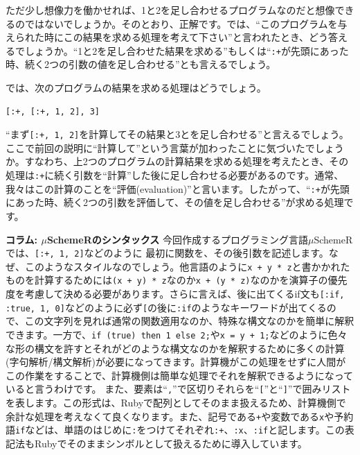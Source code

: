 ただ少し想像力を働かせれば、1と2を足し合わせるプログラムなのだと想像できるのではないでしょうか。そのとおり、正解です。では、“このプログラムを与えられた時にこの結果を求める処理を考えて下さい”と言われたとき、どう答えるでしょうか。“1と2を足し合わせた結果を求める”もしくは“{\tt :+}が先頭にあった時、続く2つの引数の値を足し合わせる”とも言えるでしょう。

では、次のプログラムの結果を求める処理はどうでしょう。

\begin{lstlisting}
[:+, [:+, 1, 2], 3]
\end{lstlisting}

“まず{\tt [:+, 1, 2]}を計算してその結果と3とを足し合わせる”と言えるでしょう。ここで前回の説明に“計算して”という言葉が加わったことに気づいたでしょうか。すなわち、上2つのプログラムの計算結果を求める処理を考えたとき、その処理は{\tt :+}に続く引数を“計算”した後に足し合わせる必要があるのです。通常、我々はこの計算のことを“評価(evaluation)”と言います。したがって、“{\tt :+}が先頭にあった時、続く2つの引数を評価して、その値を足し合わせる”が求める処理です。


\begin{breakitembox}[l]{\bf コラム: $\mu$SchemeRのシンタックス} 
今回作成するプログラミング言語$\mu$SchemeRでは、{\tt [:+, 1, 2]}などのように
最初に関数を、その後引数を記述します。なぜ、このようなスタイルなのでしょう。他言語のように{\tt x + y * z}と書かかれたものを計算するためには{\tt (x + y) * z}なのか{\tt x + (y * z)}なのかを演算子の優先度を考慮して決める必要があります。さらに言えば、後に出てくるif文も{\tt [:if, :true,  1, 0]}などのように必ず{\tt [}の後に{\tt :if}のようなキーワードが出てくるので、この文字列を見れば通常の関数適用なのか、特殊な構文なのかを簡単に解釈できます。一方で、{\tt if (true) then 1 else 2;}や{\tt x = y + 1;}などのように色々な形の構文を許すとそれがどのような構文なのかを解釈するために多くの計算(字句解析/構文解析)が必要になってきます。計算機がこの処理をせずに人間がこの作業をすることで、計算機側は簡単な処理でそれを解釈できるようになっていると言うわけです\footnotemark[2]。
また、要素は“{\tt ,}”で区切りそれらを“{\tt [}”と“{\tt ]}”で囲みリストを表します。この形式は、Rubyで配列としてそのまま扱えるため、計算機側で余計な処理を考えなくて良くなります。また、記号である{\tt +}や変数である{\tt x}や予約語{\tt if}などは、単語のはじめに{\tt :}をつけてそれぞれ{\tt :+}、{\tt :x}、{\tt :if}と記します。この表記法もRubyでそのままシンボル\footnotemark[3]として扱えるために導入しています。
\end{breakitembox}

